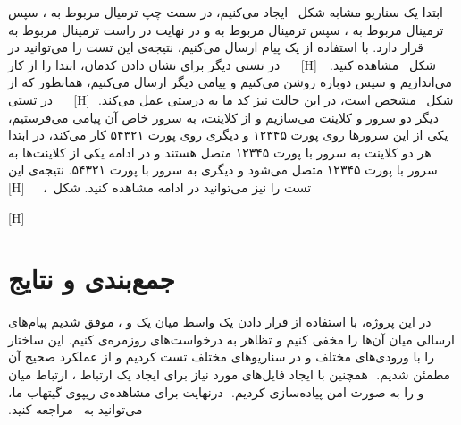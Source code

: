 ‫ابتدا یک سناریو مشابه شکل~ ایجاد می‌کنیم، در سمت چپ ترمیال مربوط به ، سپس ترمینال مربوط به ، سپس ترمینال مربوط به  و در نهایت در راست ترمینال مربوط به  قرار دارد. با استفاده از  یک پیام ارسال می‌کنیم، نتیجه‌ی این تست را می‌توانید در شکل~ مشاهده کنید.
‫
‫
‫[H]
‫
‫
‫
‫
‫در تستی دیگر برای نشان دادن  کدمان، ابتدا  را از کار می‌اندازیم و سپس دوباره روشن می‌کنیم و پیامی دیگر ارسال می‌کنیم، همانطور که از شکل~ مشخص است، در این حالت نیز کد ما به درستی عمل می‌کند.
‫
‫[H]
‫
‫
‫
‫
‫در تستی دیگر دو سرور و کلاینت می‌سازیم و از کلاینت، به سرور خاص آن پیامی می‌فرستیم، یکی از این سرورها روی پورت ۱۲۳۴۵ و دیگری روی پورت ۵۴۳۲۱ کار می‌کند، در ابتدا هر دو کلاینت به سرور با پورت ۱۲۳۴۵ متصل هستند و در ادامه یکی از کلاینت‌ها به سرور  با پورت ۱۲۳۴۵ متصل می‌شود و دیگری به سرور با پورت ۵۴۳۲۱. نتیجه‌ی این تست را نیز می‌توانید در ادامه مشاهده کنید. شکل~، ~
‫
[H]
‫

[H]
‫
‫
‫
‫\section{جمع‌بندی و نتایج}
‫در این پروژه، با استفاده از قرار دادن یک واسط میان یک  و ، موفق شدیم پیام‌های ارسالی میان آن‌ها را مخفی کنیم و تظاهر به درخواست‌های روزمره‌ی  کنیم. این ساختار را با ورودی‌های مختلف و در سناریو‌های مختلف تست کردیم و از عملکرد صحیح آن مطمئن شدیم.
‫
‫همچنین با ایجاد فایل‌های مورد نیاز برای ایجاد یک ارتباط ، ارتباط میان  و  را به صورت امن پیاده‌سازی کردیم.
‫
‫درنهایت برای مشاهده‌ی ریپوی گیتهاب ما، می‌توانید به~ مراجعه کنید.